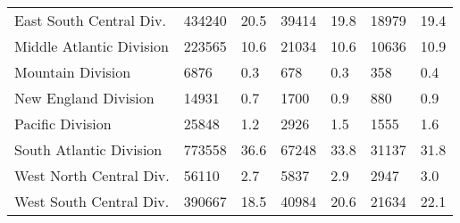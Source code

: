 \begin{longtable}{lllllll}
East South Central Div. & 434240 & 20.5 & 39414 & 19.8 & 18979 & 19.4 \\ 
Middle Atlantic Division & 223565 & 10.6 & 21034 & 10.6 & 10636 & 10.9 \\ 
Mountain Division & 6876 & 0.3 & 678 & 0.3 & 358 & 0.4 \\ 
New England Division & 14931 & 0.7 & 1700 & 0.9 & 880 & 0.9 \\ 
Pacific Division & 25848 & 1.2 & 2926 & 1.5 & 1555 & 1.6 \\ 
South Atlantic Division & 773558 & 36.6 & 67248 & 33.8 & 31137 & 31.8 \\ 
West North Central Div. & 56110 & 2.7 & 5837 & 2.9 & 2947 & 3.0 \\ 
West South Central Div. & 390667 & 18.5 & 40984 & 20.6 & 21634 & 22.1 \\ 
\bottomrule
\end{longtable}


